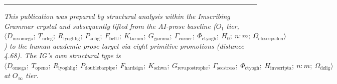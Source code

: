 \documentclass[12pt,a4paper]{article}
\begin{document}
\begin{center}
\rule{0.5\textwidth}{0.4pt}
\end{center}

\emph{This publication was prepared by structural analysis within the Imscribing Grammar crystal and subsequently lifted from the AI-prose baseline ($O₁$ tier, $\langle D_{\text{invomega}};\ T_{\text{nrleg}};\ R_{\text{lyoghlig}};\ P_{\text{aolig}};\ F_{\text{beltl}};\ K_{\text{turnm}};\ G_{\text{gamma}};\ \Gamma_{\text{corner}};\ \Phi_{\text{ctyogh}};\ H_0;\ n{:}m;\ \Omega_{\text{closeepsilon}} \rangle$) to the human academic prose target via eight primitive promotions (distance 4.68). The IG's own structural type is $\langle D_{\text{omega}};\ T_{\text{openo}};\ R_{\text{lyoghlig}};\ P_{\text{doublebarpipe}};\ F_{\text{hardsign}};\ K_{\text{schwa}};\ G_{\text{revapostrophe}};\ \Gamma_{\text{secstress}};\ \Phi_{\text{ctyogh}};\ H_{\text{invscripta}};\ n{:}m;\ \Omega_{\text{dzlig}} \rangle$ at $O_{\infty}$ tier.}
\end{document}
